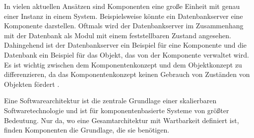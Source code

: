 In vielen aktuellen Ansätzen sind Komponenten eine große Einheit mit genau einer Instanz in einem System. Beispielsweise könnte ein Datenbankserver eine Komponente darstellen. Oftmals wird der Datenbankserver im Zusammenhang mit der Datenbank als Modul mit einem feststellbaren Zustand angesehen. Dahingehend ist der Datenbankserver ein Beispiel für eine Komponente und die Datenbank ein Beispiel für das Objekt, das von der Komponente verwaltet wird. Es ist wichtig zwischen dem Komponentenkonzept und dem Objektkonzept zu differenzieren, da das Komponentenkonzept keinen Gebrauch von Zuständen von Objekten fördert \citereset \autocite[siehe][S. 35-38]{Szyperski.2002}.

Eine Softwarearchitektur ist die zentrale Grundlage einer skalierbaren Softwaretechnologie und ist für komponentenbasierte Systeme von größter Bedeutung. Nur da, wo eine Gesamtarchitektur mit Wartbarkeit definiert ist, finden Komponenten die Grundlage, die sie benötigen.